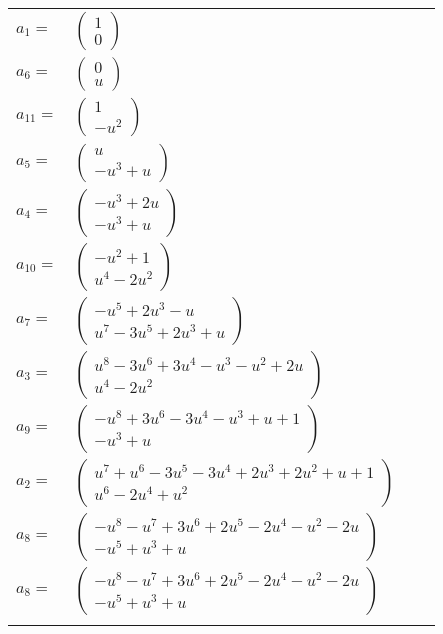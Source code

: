 \documentclass[1p]{elsarticle_modified}
\theoremstyle{definition}
\begin{document}
\begin{tabular}{m{7pt} m{180pt} m{7pt} m{180pt} }
\flushright $a_{1}=$&$\begin{pmatrix}1\\0\end{pmatrix}$ \\
\flushright $a_{6}=$&$\begin{pmatrix}0\\u\end{pmatrix}$ \\
\flushright $a_{11}=$&$\begin{pmatrix}1\\- u^2\end{pmatrix}$ \\
\flushright $a_{5}=$&$\begin{pmatrix}u\\- u^3+u\end{pmatrix}$ \\
\flushright $a_{4}=$&$\begin{pmatrix}- u^3+2 u\\- u^3+u\end{pmatrix}$ \\
\flushright $a_{10}=$&$\begin{pmatrix}- u^2+1\\u^4-2 u^2\end{pmatrix}$ \\
\flushright $a_{7}=$&$\begin{pmatrix}- u^5+2 u^3- u\\u^7-3 u^5+2 u^3+u\end{pmatrix}$ \\
\flushright $a_{3}=$&$\begin{pmatrix}u^8-3 u^6+3 u^4- u^3- u^2+2 u\\u^4-2 u^2\end{pmatrix}$ \\
\flushright $a_{9}=$&$\begin{pmatrix}- u^8+3 u^6-3 u^4- u^3+u+1\\- u^3+u\end{pmatrix}$ \\
\flushright $a_{2}=$&$\begin{pmatrix}u^7+u^6-3 u^5-3 u^4+2 u^3+2 u^2+u+1\\u^6-2 u^4+u^2\end{pmatrix}$ \\
\flushright $a_{8}=$&$\begin{pmatrix}- u^8- u^7+3 u^6+2 u^5-2 u^4- u^2-2 u\\- u^5+u^3+u\end{pmatrix}$\\ \flushright $a_{8}=$&$\begin{pmatrix}- u^8- u^7+3 u^6+2 u^5-2 u^4- u^2-2 u\\- u^5+u^3+u\end{pmatrix}$\\&\end{tabular}
\end{document}

